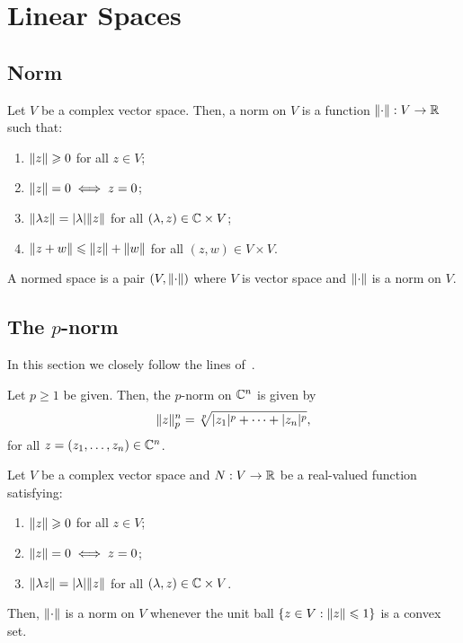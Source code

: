 \section{Linear Spaces}\label{sec:linear-spaces}

\subsection{Norm}\label{subsec:norms}

\begin{definition}\label{def:normed-linear-spaces}
  Let \(V\) be a complex vector space. Then, a norm on \(V\) is a function
  \(\norm:V\to\reals\) such that:
  \begin{enumerate}
    \item
      \(\norm(z)\geqslant{0}\) for all \(z\in{V}\);
    \item
      \(\norm(z)=0\iff{z=0}\);
    \item
      \(\norm(\lambda{z})=\abs{\lambda}\norm(z)\) for all
      \((\lambda,z)\in\mathbb{C}\times{V}\);
    \item
      \(\norm(z+w)\leqslant{\norm(z)+\norm(w)}\) for all
      \((z,w)\in{V\times{V}}\).
  \end{enumerate}
  A normed space is a pair \((V,\norm)\) where \(V\) is vector space and
  \(\norm\) is a norm on \(V\).
\end{definition}

\subsection{The \(p\)-norm}\label{subsec:p-norm}

In this section we closely follow the lines
of~\cite{yet_another_proof_of_minkowskis_inequality}.

\begin{definition}
  Let \(p\geqslant{1}\) be given. Then, the \(p\)-norm on \(\mathbb{C}^{n}\)
  is given by
  \[
    \norm<n>[p](z)
    =
    \sqrt[p]{\abs{z_{1}}^{p}+\cdots+\abs{z_{n}}^{p}},
  \]
  for all \(z=(z_{1},\ldots,z_{n})\in\mathbb{C}^{n}\).
\end{definition}

\begin{lemma}\label{lemma:on-norms-and-the-convexity-of-the-unitary-closed-ball}
  Let \(V\) be a complex vector space and \(N:V\to\mathbb{R}\) be a real-valued
  function satisfying:
  \begin{enumerate}
    \item
      \(\norm(z)\geqslant{0}\) for all \(z\in{V}\);
    \item
      \(\norm(z)=0\iff{z=0}\);
    \item
      \(\norm(\lambda{z})=\abs{\lambda}\norm(z)\) for all
      \((\lambda,z)\in\mathbb{C}\times{V}\).
  \end{enumerate}
  Then, \(\norm\) is a norm on \(V\) whenever the unit ball
  \(\left\{z\in{V}:\norm(z)\leqslant{1}\right\}\) is a convex set.
\end{lemma}

